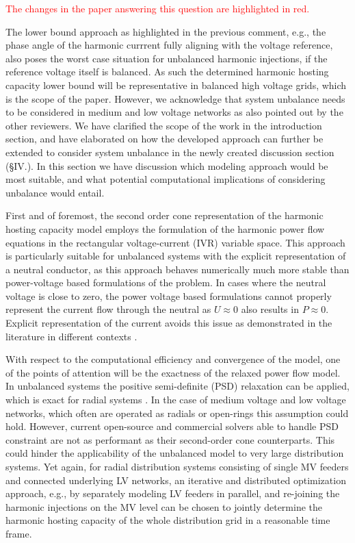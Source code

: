 \documentclass[10pt]{article}
\begin{document}
\begin{tcolorbox}[colback=black!5!white,colframe=black]

\textcolor{red}{The changes in the paper answering this question are highlighted in red.} \newline

The lower bound approach as highlighted in the previous comment, e.g., the phase angle of the harmonic currrent fully aligning with the voltage reference, also poses the worst case situation for unbalanced harmonic injections, if the reference voltage itself is balanced. As such the determined harmonic hosting capacity lower bound will be representative in balanced high voltage grids, which is the scope of the paper. However, we acknowledge that system unbalance needs to be considered in medium and low voltage networks as also pointed out by the other reviewers. We have clarified the scope of the work in the introduction section, and have elaborated on how the developed approach can further be extended to consider system unbalance in the newly created discussion section (\S IV.). In this section we have discussion which modeling approach would be most suitable, and what potential computational implications of considering unbalance would entail. 

First and of foremost, the second order cone representation of the harmonic hosting capacity model employs the formulation of the harmonic power flow equations in the rectangular voltage-current (IVR) variable space. This approach is particularly suitable for unbalanced systems with the explicit representation of a neutral conductor, as this approach behaves numerically much more stable than power-voltage based formulations of the problem. In cases where the neutral voltage is close to zero, the power voltage based formulations cannot properly represent the current flow through the neutral as $U \approx 0$ also results in $P \approx 0 $. Explicit representation of the current avoids this issue as demonstrated in the literature in different contexts \cite{claeys_applications_2021, jat_hybrid_2024}.

With respect to the computational efficiency and convergence of the model, one of the points of attention will be the exactness of the relaxed power flow model. In unbalanced systems the positive semi-definite (PSD) relaxation can be applied, which is exact for radial systems \cite{geth_pitfalls_2023} . In the case of medium voltage and low voltage networks, which often are operated as radials or open-rings this assumption could hold. However, current open-source and commercial solvers able to handle PSD constraint are not as performant as their second-order cone counterparts. This could hinder the applicability of the unbalanced model to very large distribution systems. Yet again, for radial distribution systems consisting of single MV feeders and connected underlying LV networks, an iterative and distributed optimization approach, e.g., by separately modeling LV feeders in parallel, and re-joining the harmonic injections on the MV level can be chosen to jointly determine the harmonic hosting capacity of the whole distribution grid in a reasonable time frame.


\end{tcolorbox}
\end{document}

